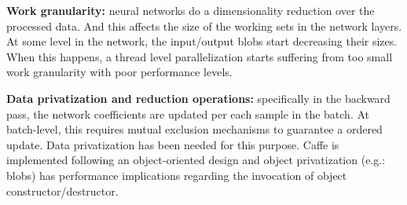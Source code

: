 \textbf{Work granularity:} neural networks do
a dimensionality reduction over the processed data.
And this affects the size of the working sets in the network layers.
At some level in the network, the input/output blobs start decreasing their sizes. When this happens, a thread level parallelization
starts suffering from too small work granularity with poor performance levels.

\textbf{Data privatization and reduction operations:} specifically in the
backward pass, the network coefficients are updated per each
sample in the batch. At batch-level, this requires mutual exclusion
mechanisms to guarantee a ordered update. Data privatization has
been needed for this purpose. Caffe is implemented following an
object-oriented design and object privatization (e.g.: blobs) 
has performance implications regarding the invocation of object 
constructor/destructor.


